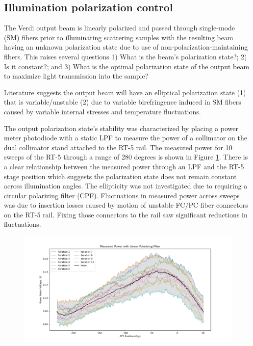 \subsection{Illumination polarization control}
The Verdi output beam is linearly polarized and passed through single-mode (SM) fibers prior to illuminating scattering samples with the resulting beam having an unknown polarization state due to use of non-polarization-maintaining fibers. This raises several questions 1) What is the beam's polarization state?; 2) Is it constant?; and 3) What is the optimal polarization state of the output beam to maximize light transmission into the sample?

Literature suggests the output beam will have an elliptical polarization state (1) that is variable/unstable (2) due to variable birefringence induced in SM fibers caused by variable internal stresses and temperature fluctuations.

The output polarization state's stability was characterized by placing a power meter photodiode with a static LPF to measure the power of a collimator on the dual collimator stand attached to the RT-5 rail. The measured power for 10 sweeps of the RT-5 through a range of 280 degrees is shown in Figure \ref{fig:lpfpwr_RT5}. There is a clear relationship between the measured power through an LPF and the RT-5 stage position which suggests the polarization state does not remain constant across illumination angles. The ellipticity was not investigated due to requiring a circular polarizing filter (CPF). Fluctuations in measured power across sweeps was due to insertion losses caused by motion of unstable FC/PC fiber connectors on the RT-5 rail. Fixing those connectors to the rail saw significant reductions in fluctuations.

\begin{figure}
    \centering
    \includegraphics[width=\linewidth]{figures/LPFpwr_vs_RT5.png}
    \caption{}
    \label{fig:lpfpwr_RT5}
\end{figure}

